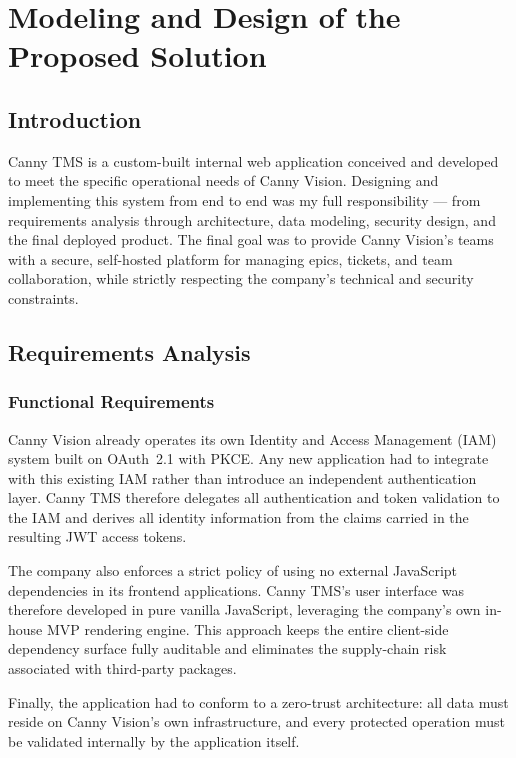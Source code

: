 \chapter{Modeling and Design of the Proposed Solution}

\section{Introduction}

Canny TMS is a custom-built internal web application conceived
and developed to meet the specific operational needs of Canny Vision. Designing and
implementing this system from end to end was my full responsibility --- from requirements
analysis through architecture, data modeling, security design, and the final deployed
product. The final goal was to provide Canny Vision's teams with a secure,
self-hosted platform for managing epics, tickets, and team collaboration, while strictly
respecting the company's technical and security constraints.

\section{Requirements Analysis}

\subsection{Functional Requirements}

Canny Vision already operates its own Identity and Access Management (IAM) system built
on OAuth~2.1 with PKCE. Any new application had to integrate with this existing IAM rather
than introduce an independent authentication layer. Canny TMS therefore delegates all
authentication and token validation to the IAM and derives all identity information from
the claims carried in the resulting JWT access tokens.

The company also enforces a strict policy of using no external JavaScript dependencies in
its frontend applications. Canny TMS's user interface was therefore developed in pure
vanilla JavaScript, leveraging the company's own in-house MVP rendering engine. This
approach keeps the entire client-side dependency surface fully auditable and eliminates
the supply-chain risk associated with third-party packages.

Finally, the application had to conform to a zero-trust architecture: all data must reside
on Canny Vision's own infrastructure, and every protected operation must be validated
internally by the application itself.
